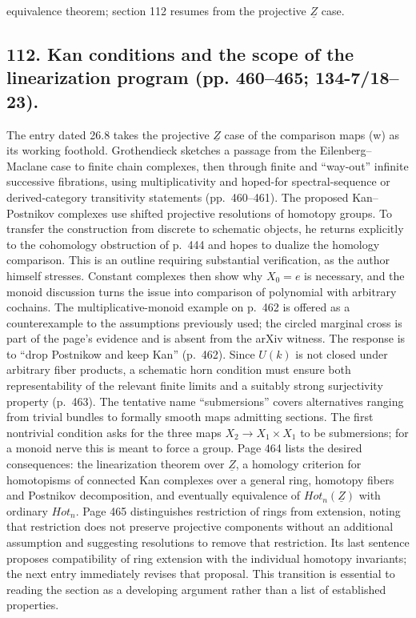 \documentclass[10pt,oneside]{book}
\begin{document}
equivalence theorem; section 112 resumes from the projective $\underline Z$ case.

\subsection*{112. Kan conditions and the scope of the linearization program (pp. 460--465; 134-7/18--23).}
The entry dated 26.8 takes the projective $\underline Z$ case of the comparison maps (w) as its working foothold. Grothendieck sketches a passage from the Eilenberg--Maclane case to finite chain complexes, then through finite and ``way-out'' infinite successive fibrations, using multiplicativity and hoped-for spectral-sequence or derived-category transitivity statements (pp.~460--461). The proposed Kan--Postnikov complexes use shifted projective resolutions of homotopy groups. To transfer the construction from discrete to schematic objects, he returns explicitly to the cohomology obstruction of p.~444 and hopes to dualize the homology comparison. This is an outline requiring substantial verification, as the author himself stresses. Constant complexes then show why $X_0=e$ is necessary, and the monoid discussion turns the issue into comparison of polynomial with arbitrary cochains. The multiplicative-monoid example on p.~462 is offered as a counterexample to the assumptions previously used; the circled marginal cross is part of the page's evidence and is absent from the arXiv witness. The response is to ``drop Postnikow and keep Kan'' (p.~462). Since $U(k)$ is not closed under arbitrary fiber products, a schematic horn condition must ensure both representability of the relevant finite limits and a suitably strong surjectivity property (p.~463). The tentative name ``submersions'' covers alternatives ranging from trivial bundles to formally smooth maps admitting sections. The first nontrivial condition asks for the three maps $X_2\to X_1\times X_1$ to be submersions; for a monoid nerve this is meant to force a group. Page 464 lists the desired consequences: the linearization theorem over $\underline Z$, a homology criterion for homotopisms of connected Kan complexes over a general ring, homotopy fibers and Postnikov decomposition, and eventually equivalence of $Hot_n(\underline Z)$ with ordinary $Hot_n$. Page 465 distinguishes restriction of rings from extension, noting that restriction does not preserve projective components without an additional assumption and suggesting resolutions to remove that restriction. Its last sentence proposes compatibility of ring extension with the individual homotopy invariants; the next entry immediately revises that proposal. This transition is essential to reading the section as a developing argument rather than a list of established properties.
\end{document}
